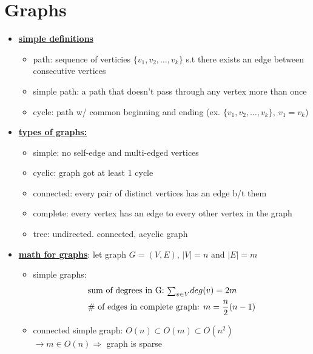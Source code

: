 \section*{Graphs}
\begin{itemize}
    \item \textbf{\ul{simple definitions}}
    \begin{itemize}[leftmargin = 1em]
        \item path: sequence of verticies $\{v_1, v_2, \ldots, v_k\}$ s.t there exists an edge between consecutive vertices 
        \item simple path: a path that doesn't pass through any vertex more than once
        \item cycle: path w/ common beginning and ending (ex. $\{ v_1, v_2, \ldots, v_k \},~ v_1 = v_k$)
    \end{itemize}
    \item \textbf{\ul{types of graphs:}}
    \begin{itemize}[leftmargin = 1em]
        \item simple: no self-edge and multi-edged vertices
        \item cyclic: graph got at least 1 cycle
        \item connected: every pair of distinct vertices has an edge b/t them 
        \item complete: every vertex has an edge to every other vertex in the graph
        \item tree: undirected. connected, acyclic graph 
    \end{itemize}
    \item \ul{\textbf{math for graphs}}: let graph $G = (V,E)$, $| V| = n $ and $|E| = m$ 
    \begin{itemize}[leftmargin = 1em]
        \item simple graphs:
        \begin{align*}
            &\text{sum of degrees in G: } \small {\scriptstyle \sum} _{v \in V} deg(v) = 2m \\
            &\text{\# of edges in complete graph: } m = \frac{n}{2} (n-1)
        \end{align*}
        \item connected simple graph: $O(n) \subset O(m) \subset O(n^2)$ \\
        $\longrightarrow m \in O(n) \Longrightarrow $ graph is sparse \\

\end{itemize}
\end{itemize}
